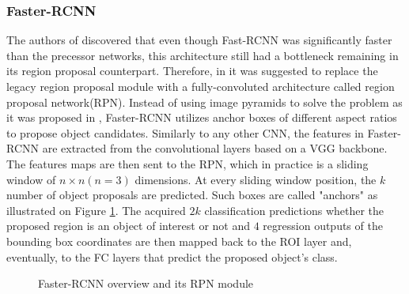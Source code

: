 \documentclass[english, 12pt, a4paper, elec, utf8, a-1b, online]{aaltothesis}
\begin{document}
\subsubsection{Faster-RCNN}
The authors of \cite{ima} discovered that even though Fast-RCNN was significantly faster than the precessor networks, this architecture still had a bottleneck remaining in its region proposal counterpart. Therefore, in \cite{ima} it was suggested to replace the legacy region proposal module with a fully-convoluted architecture called region proposal network(RPN)\cite{Girshick2013}. Instead of using image pyramids to solve the problem as it was proposed in \cite{Girshick2015}, Faster-RCNN \cite{ima} utilizes anchor boxes of different aspect ratios to propose object candidates. Similarly to any other CNN, the features in Faster-RCNN are extracted from the convolutional layers based on a VGG backbone. The features maps are then sent to the RPN, which in practice is a sliding window  of $n\times n (n=3)$ dimensions. At every sliding window position, the $k$ number of object proposals are predicted. Such boxes are called "anchors" as illustrated on Figure \ref{fig:faster_rcnn}. The acquired $2k$ classification predictions whether the proposed region is an object of interest or not and $4$ regression outputs of the bounding box coordinates are then mapped back to the ROI layer and, eventually, to the FC layers that predict the proposed object's class. \cite{ima}


\begin{figure}[htb]
    \centering
    \qquad
    \caption{Faster-RCNN overview and its RPN module}\cite{ima}
    \label{fig:faster_rcnn}%
\end{figure}
\FloatBarrier
\end{document}
